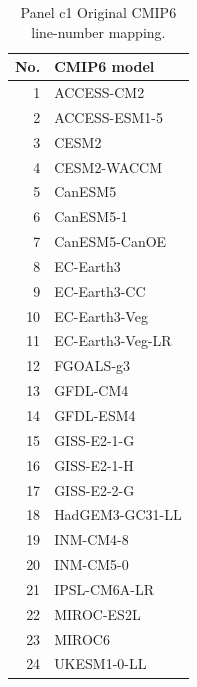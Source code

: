 \begin{table}[tp]
\centering
\footnotesize
\begin{tabular}{rl}
\toprule
No. & CMIP6 model \\
\midrule
1 & ACCESS-CM2 \\
2 & ACCESS-ESM1-5 \\
3 & CESM2 \\
4 & CESM2-WACCM \\
5 & CanESM5 \\
6 & CanESM5-1 \\
7 & CanESM5-CanOE \\
8 & EC-Earth3 \\
9 & EC-Earth3-CC \\
10 & EC-Earth3-Veg \\
11 & EC-Earth3-Veg-LR \\
12 & FGOALS-g3 \\
13 & GFDL-CM4 \\
14 & GFDL-ESM4 \\
15 & GISS-E2-1-G \\
16 & GISS-E2-1-H \\
17 & GISS-E2-2-G \\
18 & HadGEM3-GC31-LL \\
19 & INM-CM4-8 \\
20 & INM-CM5-0 \\
21 & IPSL-CM6A-LR \\
22 & MIROC-ES2L \\
23 & MIROC6 \\
24 & UKESM1-0-LL \\
\bottomrule
\end{tabular}
\caption{Panel c1 Original CMIP6 line-number mapping.}
\label{tab:observational_alignment_panel_c1_original_cmip6_model_numbers}
\end{table}
